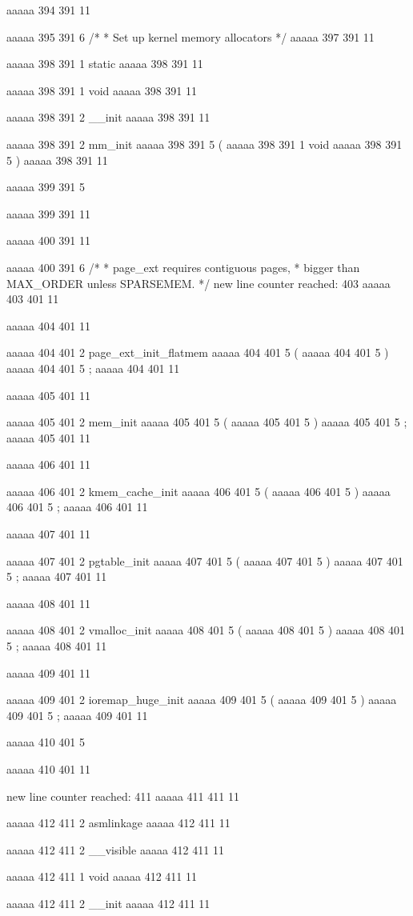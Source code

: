 aaaaa 394 391
11


aaaaa 395 391
6
/*
 * Set up kernel memory allocators
 */
aaaaa 397 391
11


aaaaa 398 391
1
static
aaaaa 398 391
11
 
aaaaa 398 391
1
void
aaaaa 398 391
11
 
aaaaa 398 391
2
__init
aaaaa 398 391
11
 
aaaaa 398 391
2
mm_init
aaaaa 398 391
5
(
aaaaa 398 391
1
void
aaaaa 398 391
5
)
aaaaa 398 391
11


aaaaa 399 391
5
{
aaaaa 399 391
11


aaaaa 400 391
11
	
aaaaa 400 391
6
/*
	 * page_ext requires contiguous pages,
	 * bigger than MAX_ORDER unless SPARSEMEM.
	 */
new line counter reached: 403
aaaaa 403 401
11


aaaaa 404 401
11
	
aaaaa 404 401
2
page_ext_init_flatmem
aaaaa 404 401
5
(
aaaaa 404 401
5
)
aaaaa 404 401
5
;
aaaaa 404 401
11


aaaaa 405 401
11
	
aaaaa 405 401
2
mem_init
aaaaa 405 401
5
(
aaaaa 405 401
5
)
aaaaa 405 401
5
;
aaaaa 405 401
11


aaaaa 406 401
11
	
aaaaa 406 401
2
kmem_cache_init
aaaaa 406 401
5
(
aaaaa 406 401
5
)
aaaaa 406 401
5
;
aaaaa 406 401
11


aaaaa 407 401
11
	
aaaaa 407 401
2
pgtable_init
aaaaa 407 401
5
(
aaaaa 407 401
5
)
aaaaa 407 401
5
;
aaaaa 407 401
11


aaaaa 408 401
11
	
aaaaa 408 401
2
vmalloc_init
aaaaa 408 401
5
(
aaaaa 408 401
5
)
aaaaa 408 401
5
;
aaaaa 408 401
11


aaaaa 409 401
11
	
aaaaa 409 401
2
ioremap_huge_init
aaaaa 409 401
5
(
aaaaa 409 401
5
)
aaaaa 409 401
5
;
aaaaa 409 401
11


aaaaa 410 401
5
}
aaaaa 410 401
11


new line counter reached: 411
aaaaa 411 411
11


aaaaa 412 411
2
asmlinkage
aaaaa 412 411
11
 
aaaaa 412 411
2
__visible
aaaaa 412 411
11
 
aaaaa 412 411
1
void
aaaaa 412 411
11
 
aaaaa 412 411
2
__init
aaaaa 412 411
11
 
